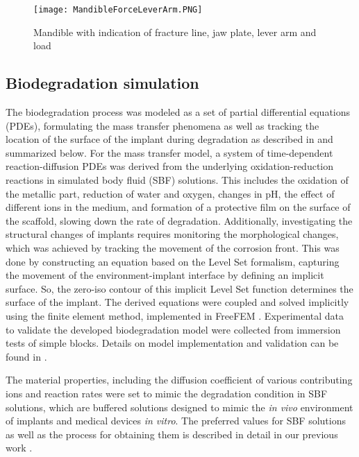 \begin{figure}[h]
    \centering
    \medskip
    \texttt{[image: MandibleForceLeverArm.PNG]}
    \caption{Mandible with indication of fracture line, jaw plate, lever arm and load}
    \label{fig:MandibleForceLeverArm}
\end{figure}


\subsection{Biodegradation simulation}
\label{sec:biodeg}

The biodegradation process was modeled as a set of partial differential equations (\gls{PDE}s), formulating the mass transfer phenomena as well as tracking the location of the surface of the implant during degradation as described in \cite{Barzegari2021} and summarized below. For the mass transfer model, a system of time-dependent reaction-diffusion PDEs was derived from the underlying oxidation-reduction reactions in simulated body fluid (\gls{SBF}) solutions. This includes the oxidation of the metallic part, reduction of water and oxygen, changes in pH, the effect of different ions in the medium, and formation of a protective film on the surface of the scaffold, slowing down the rate of degradation. Additionally, investigating the structural changes of implants requires monitoring the morphological changes, which was achieved by tracking the movement of the corrosion front. This was done by constructing an equation based on the Level Set formalism, capturing the movement of the environment-implant interface by defining an implicit surface. So, the zero-iso contour of this implicit Level Set function determines the surface of the implant. The derived equations were coupled and solved implicitly using the finite element method, implemented in FreeFEM \cite{Hecht2012}. Experimental data to validate the developed biodegradation model were collected from immersion tests of simple blocks. Details on model implementation and validation can be found in \cite{Barzegari2021}.

The material properties, including the diffusion coefficient of various contributing ions and reaction rates were set to mimic the degradation condition in \gls{SBF} solutions, which are buffered solutions designed to mimic the \textit{in vivo} environment of implants and medical devices \textit{in vitro}. The preferred values for \gls{SBF} solutions as well as the process for obtaining them is described in detail in our previous work \cite{Barzegari2021}.

